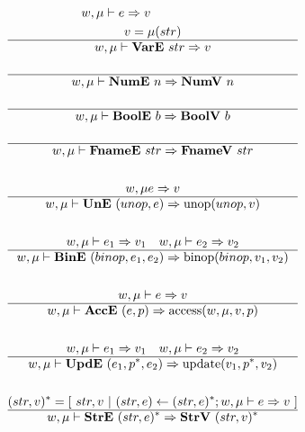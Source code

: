 
\begin{gather*}
  w, \mu \vdash e \Rightarrow v
%
\newline \\
  v = \mu(str) \\
  \hline
  w, \mu \vdash \vare ~ str \Rightarrow v \\
%
\newline \\
  \hline
  w, \mu \vdash \nume ~ n \Rightarrow \numv ~ n \\
%
\newline \\
  \hline
  w, \mu \vdash \boole ~ b \Rightarrow \boolv ~ b \\
%
\newline \\
  \hline
  w, \mu \vdash \fnamee ~ str \Rightarrow \fnamev ~ str \\
%
\newline \\
  w, \mu e \Rightarrow v \\
  \hline
  w, \mu \vdash \une ~ (unop, e) \Rightarrow \unop(unop, v) \\
%
\newline \\
  w, \mu \vdash e_1 \Rightarrow v_1 \quad w, \mu \vdash e_2 \Rightarrow v_2 \\
  \hline
  w, \mu \vdash \bine ~ (binop, e_1, e_2) \Rightarrow \binop(binop, v_1, v_2) \\
%
\newline \\
  w, \mu \vdash e \Rightarrow v \\
  \hline
  w, \mu \vdash \acce ~ (e, p) \Rightarrow \access(w, \mu, v, p) \\
%
\newline \\
  w, \mu \vdash e_1 \Rightarrow v_1 \quad w, \mu \vdash e_2 \Rightarrow v_2 \\
  \hline
  w, \mu \vdash \upde ~ (e_1, \seq p, e_2) \Rightarrow \update(v_1, \seq p, v_2) \\
%
\newline \\
  \seq{(str, v)} =
    [ ~
      str, v
    ~ | ~
      (str, e) \leftarrow \seq{(str, e)}; w, \mu \vdash e \Rightarrow v
    ~ ] \\
  \hline
  w, \mu \vdash \stre ~ \seq{(str, e)} \Rightarrow \strv ~ \seq{(str, v)} \\

\end{gather*}
